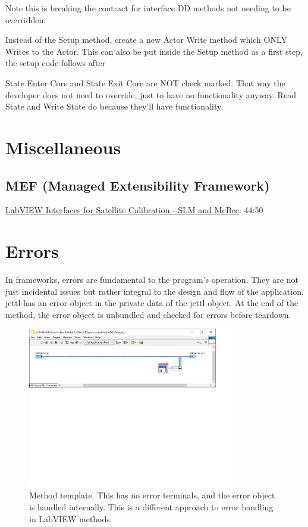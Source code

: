 \documentclass{article}
\begin{document}
Note this is breaking the contract for interface DD methods not needing to be overridden.

Instead of the Setup method, create a new Actor Write method which ONLY Writes to the Actor. This can also be put inside the Setup method as a first step, the setup code follows after

State Enter Core and State Exit Core are NOT check marked.
That way the developer does not need to override, just to have no functionality anyway.
Read State and Write State do because they'll have functionality.

\section{Miscellaneous}
\label{sec:miscellaneous}

\subsection{MEF (Managed Extensibility Framework)}
\label{subsec:mef}

\href{https://www.youtube.com/watch?v=rrtz7sKCg2A}{LabVIEW Interfaces for Satellite Calibration - SLM and McBee}: 44:50

\section{Errors}
\label{sec:errors}

In frameworks, errors are fundamental to the program's operation. They are not just incidental issues but rather integral to the design and flow of the application.
jettl has an error object in the private data of the jettl object. At the end of the method, the error object is unbundled and checked for errors before teardown.

\begin{figure}[h]
    \centering
    \includegraphics[width=0.8\textwidth]{figures/method-template}
    \caption{Method template. This has no error terminals, and the error object is handled internally. This is a different approach to error handling in LabVIEW methods.}
    \label{fig:method-template}
\end{figure}
\end{document}

